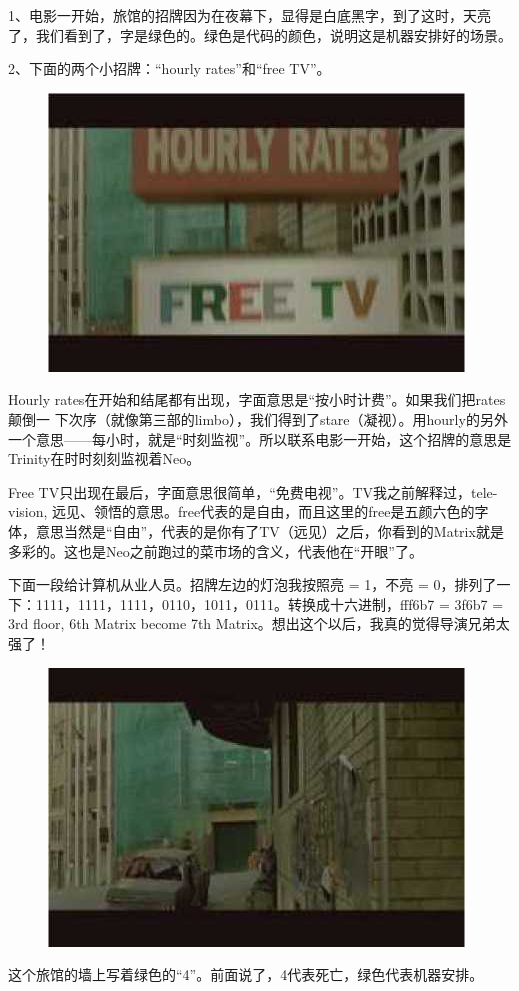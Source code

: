 \documentclass[UTF8]{ctexart}
\begin{document}
1、电影一开始，旅馆的招牌因为在夜幕下，显得是白底黑字，到了这时，天亮了，我们看到了，字是绿色的。绿色是代码的颜色，说明这是机器安排好的场景。

2、下面的两个小招牌：“hourly rates”和“free TV”。

\begin{figure}[!h]
\centering
\includegraphics[width=0.5\linewidth]{fig/read_Matrix-86}
\end{figure}

Hourly rates在开始和结尾都有出现，字面意思是“按小时计费”。如果我们把rates颠倒一 下次序（就像第三部的limbo），我们得到了stare（凝视）。用hourly的另外一个意思——每小时，就是“时刻监视”。所以联系电影一开始，这个招牌的意思是Trinity在时时刻刻监视着Neo。

Free TV只出现在最后，字面意思很简单，“免费电视”。TV我之前解释过，tele-vision, 远见、领悟的意思。free代表的是自由，而且这里的free是五颜六色的字体，意思当然是“自由”，代表的是你有了TV（远见）之后，你看到的Matrix就是多彩的。这也是Neo之前跑过的菜市场的含义，代表他在“开眼”了。

下面一段给计算机从业人员。招牌左边的灯泡我按照亮 = 1，不亮 = 0，排列了一下：1111，1111，1111，0110，1011，0111。转换成十六进制，fff6b7 = 3f6b7 = 3rd floor, 6th Matrix become 7th Matrix。想出这个以后，我真的觉得导演兄弟太强了！

\begin{figure}[htb]
\centering
\includegraphics[width=0.5\linewidth]{fig/read_Matrix-87}
\end{figure}

这个旅馆的墙上写着绿色的“4”。前面说了，4代表死亡，绿色代表机器安排。
\end{document}
